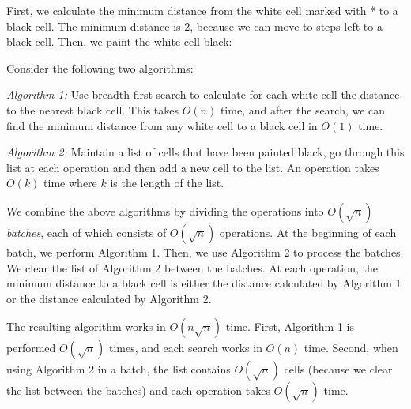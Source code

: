 \begin{center}
\end{center}

First, we calculate the minimum distance
from  the white cell marked with * to a black cell.
The minimum distance is 2, because we can move
to steps left to a black cell.
Then, we paint the white cell black:

\begin{center}
\end{center}

Consider the following two algorithms:

\emph{Algorithm 1:} Use breadth-first search
to calculate
for each white cell the distance to the nearest black cell.
This takes $O(n)$ time, and after the search,
we can find the minimum distance from any white cell
to a black cell in $O(1)$ time.

\emph{Algorithm 2:} Maintain a list of cells that have been
painted black, go through this list at each operation
and then add a new cell to the list.
An operation takes $O(k)$ time where $k$ is the length of the list.

We combine the above algorithms by
dividing the operations into
$O(\sqrt n)$ \emph{batches}, each of which consists
of $O(\sqrt n)$ operations.
At the beginning of each batch,
we perform Algorithm 1.
Then, we use Algorithm 2 to process the batches.
We clear the list of Algorithm 2 between
the batches.
At each operation,
the minimum distance to a black cell
is either the distance calculated by Algorithm 1
or the distance calculated by Algorithm 2.

The resulting algorithm works in
$O(n \sqrt n)$ time.
First, Algorithm 1 is performed $O(\sqrt n)$ times,
and each search works in $O(n)$ time.
Second, when using Algorithm 2 in a batch,
the list contains $O(\sqrt n)$ cells
(because we clear the list between the batches)
and each operation takes $O(\sqrt n)$ time.

